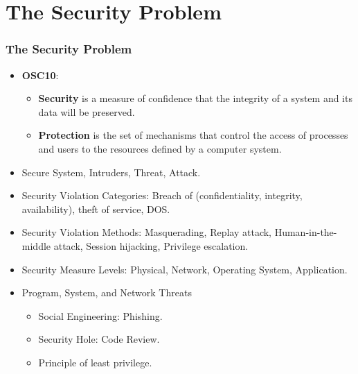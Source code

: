 \documentclass[aspectratio=169, xcolor=table, notheorems, hyperref={pdfpagelabels=false}]{beamer}
\begin{document}
\section{The Security Problem}
\begin{frame}[fragile]
\frametitle{The Security Problem}
\begin{itemize}
\item \textbf{OSC10}:
\begin{itemize}
\item \textbf{Security} is a measure of confidence that the integrity of 
      a system and its data will be preserved.
\item \textbf{Protection} is the set of mechanisms that control the access
      of processes and users to the resources defined by a computer system.
\end{itemize}
\item Secure System, Intruders, Threat, Attack.
\item Security Violation Categories: Breach of (confidentiality, integrity, 
      availability), theft of service, DOS.
\item Security Violation Methods: Masquerading, Replay attack, 
      Human-in-the-middle attack, Session hijacking, Privilege escalation.
\item Security Measure Levels: Physical, Network, Operating System, Application. 
\item Program, System, and Network Threats
\begin{itemize}
\item Social Engineering: Phishing.
\item Security Hole: Code Review.
\item Principle of least privilege.
\end{itemize}
\end{itemize}
\end{frame}
\end{document}
